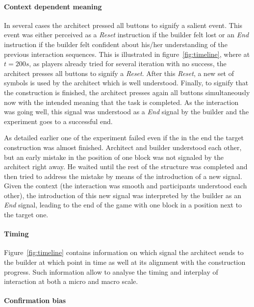 \paragraph{Context dependent meaning} 

In several cases the architect pressed all buttons to signify a salient event. This event was either perceived as a \emph{Reset} instruction if the builder felt lost or an \emph{End} instruction if the builder felt confident about his/her understanding of the previous interaction sequences. This is illustrated in figure~\ref{fig:timeline}, where at $t=200 s$, as players already tried for several iteration with no success, the architect presses all buttons to signify a \emph{Reset}. After this \emph{Reset}, a new set of symbols is used by the architect which is well understood. Finally, to signify that the construction is finished, the architect presses again all buttons simultaneously now with the intended meaning that the task is completed. As the interaction was going well, this signal was understood as a \emph{End} signal by the builder and the experiment goes to a successful end.

As detailed earlier one of the experiment failed even if the in the end the target construction was almost finished. Architect and builder understood each other, but an early mistake in the position of one block was not signaled by the architect right away. He waited until the rest of the structure was completed and then tried to address the mistake by means of the introduction of a new signal. Given the context (the interaction was smooth and participants understood each other), the introduction of this new signal was interpreted by the builder as an \emph{End} signal, leading to the end of the game with one block in a position next to the target one.

\paragraph{Timing} 

Figure~\ref{fig:timeline} contains information on which signal the architect sends to the builder at which point in time as well at its alignment with the construction progress. Such information allow to analyse the timing and interplay of interaction at both a micro and macro scale.

\paragraph{Confirmation bias} 

